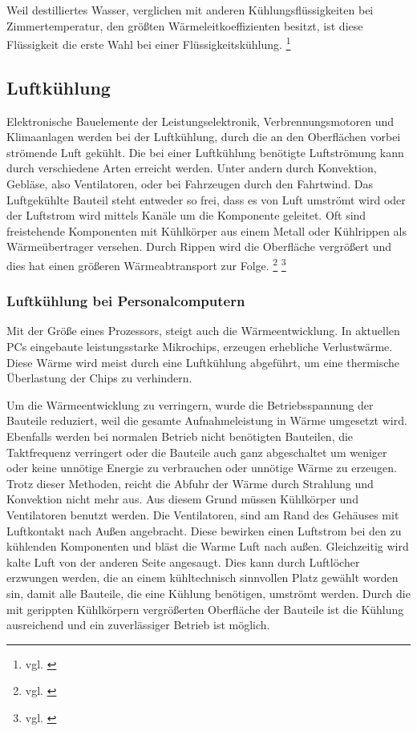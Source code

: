 Weil destilliertes Wasser, verglichen mit anderen Kühlungsflüssigkeiten bei Zimmertemperatur, den größten Wärmeleitkoeffizienten besitzt, ist diese Flüssigkeit die erste Wahl bei einer Flüssigkeitskühlung. \footnote{vgl. \cite{Wasserkuehlung}}

\newpage

\subsection{Luftkühlung} 

Elektronische Bauelemente der Leistungselektronik, Verbrennungsmotoren und Klimaanlagen werden bei der Luftkühlung, durch die an den Oberflächen vorbei strömende Luft gekühlt.
Die bei einer Luftkühlung benötigte Luftströmung kann durch verschiedene Arten erreicht werden. Unter andern durch Konvektion, Gebläse, also Ventilatoren, oder bei Fahrzeugen durch den Fahrtwind. 
Das Luftgekühlte Bauteil steht entweder so frei, dass es von Luft umströmt wird oder der Luftstrom wird mittels Kanäle um die Komponente geleitet. Oft sind freistehende Komponenten mit Kühlkörper aus einem Metall oder Kühlrippen als Wärmeübertrager versehen. Durch Rippen wird die Oberfläche vergrößert und dies hat einen größeren Wärmeabtransport zur Folge. \footnote{vgl. \cite{Luftkuehlung1}} \footnote{vgl. \cite{Luftkuehlung2}}

\subsubsection{Luftkühlung bei Personalcomputern}

Mit der Größe eines Prozessors, steigt auch die Wärmeentwicklung. In aktuellen PCs eingebaute leistungsstarke Mikrochips, erzeugen erhebliche Verlustwärme. Diese Wärme wird meist durch eine Luftkühlung abgeführt, um eine thermische Überlastung der Chips zu verhindern.

Um die Wärmeentwicklung zu verringern, wurde die Betriebsspannung der Bauteile reduziert, weil die gesamte Aufnahmeleistung in Wärme umgesetzt wird. Ebenfalls werden bei normalen Betrieb nicht benötigten Bauteilen, die Taktfrequenz verringert oder die Bauteile auch ganz abgeschaltet um weniger oder keine unnötige Energie zu verbrauchen oder unnötige Wärme zu erzeugen. Trotz dieser Methoden, reicht die Abfuhr der Wärme durch Strahlung und Konvektion nicht mehr aus.
Aus diesem Grund müssen Kühlkörper und Ventilatoren benutzt werden. Die Ventilatoren, sind am Rand des Gehäuses mit Luftkontakt nach Außen angebracht. Diese bewirken einen Luftstrom bei den zu kühlenden Komponenten und bläst die Warme Luft nach außen. Gleichzeitig wird kalte Luft von der anderen Seite angesaugt. Dies kann durch Luftlöcher erzwungen werden, die an einem kühltechnisch sinnvollen Platz gewählt worden sin, damit alle Bauteile, die eine Kühlung benötigen, umströmt werden.
Durch die mit gerippten Kühlkörpern vergrößerten Oberfläche der Bauteile ist die Kühlung ausreichend und ein zuverlässiger Betrieb ist möglich. 

